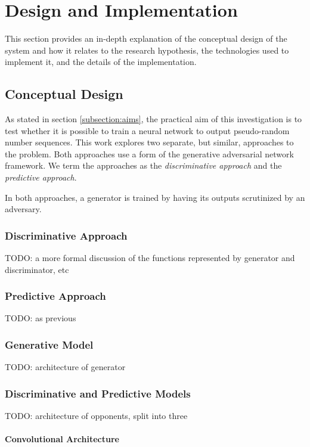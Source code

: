 \documentclass[12pt, titlepage]{report}
\theoremstyle{definition}
\begin{document}
\chapter{Design and Implementation}\label{chapter:design}
This section provides an in-depth explanation of the conceptual design of the system and how it relates to the research hypothesis, the technologies used to implement it, and the details of the implementation.

\section{Conceptual Design}\label{section:conceptual_design}
As stated in section \ref{subsection:aims}, the practical aim of this investigation is to test whether it is possible to train a neural network to output pseudo-random number sequences. This work explores two separate, but similar, approaches to the problem. Both approaches use a form of the generative adversarial network framework. We term the approaches as the \textit{discriminative approach} and the \textit{predictive approach}.

In both approaches, a generator is trained by having its outputs scrutinized by an adversary.

\subsection{Discriminative Approach}
TODO: a more formal discussion of the functions represented by generator and discriminator, etc
\subsection{Predictive Approach}
TODO: as previous
\subsection{Generative Model}
TODO: architecture of generator
\subsection{Discriminative and Predictive Models}
TODO: architecture of opponents, split into three
\subsubsection{Convolutional Architecture}
\end{document}
